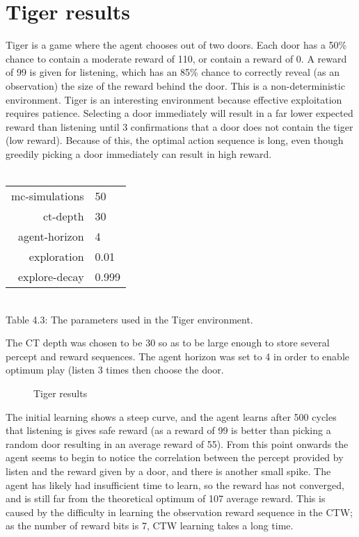 \documentclass[pdftex,twoside,a4paper]{report}
\begin{document}
\section{Tiger results}
Tiger is a game where the agent chooses out of two doors. Each door has a 50\% chance to contain a moderate reward of 110, or contain a reward of 0. A reward of 99 is given for listening, which has an 85\% chance to correctly reveal (as an observation) the size of the reward behind the door. This is a non-deterministic environment. Tiger is an interesting environment because effective exploitation requires patience. Selecting a door immediately will result in a far lower expected reward than listening until 3 confirmations that a door does not contain the tiger (low reward). Because of this, the optimal action sequence is long, even though greedily picking a door immediately can result in high reward.\\\\
\begin{center}
\begin{tabular}{| r | l | }
\hline
mc-simulations & 50\\
ct-depth & 30\\
agent-horizon & 4\\
exploration & 0.01\\
explore-decay & 0.999\\
\hline
\end{tabular}\\
\vspace{0.5mm}
Table 4.3: The parameters used in the Tiger environment.
\end{center}
The CT depth was chosen to be 30 so as to be large enough to store several percept and reward sequences. The agent horizon was set to 4 in order to enable optimum play (listen 3 times then choose the door.

 \begin{figure}[h]
   \begin{center}
   \end{center}
   \caption{Tiger results}
   \label{fig:tiger_results}
 \end{figure}
The initial learning shows a steep curve, and the agent learns after 500 cycles that listening is gives safe reward (as a reward of 99 is better than picking a random door resulting in an average reward of 55). From this point onwards the agent seems to begin to notice the correlation between the percept provided by listen and the reward given by a door, and there is another small spike. The agent has likely had insufficient time to learn, so the reward has not converged, and is still far from the theoretical optimum of 107 average reward. This is caused by the difficulty in learning the observation reward sequence in the CTW; as the number of reward bits is 7, CTW learning takes a long time.
\end{document}
